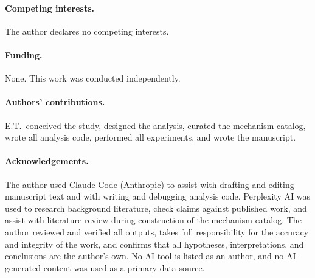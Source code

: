 \documentclass[11pt]{article}
\begin{document}
\paragraph{Competing interests.}
The author declares no competing interests.

\paragraph{Funding.}
None. This work was conducted independently.

\paragraph{Authors' contributions.}
E.T.\ conceived the study, designed the analysis, curated the mechanism catalog, wrote all analysis code, performed all experiments, and wrote the manuscript.

\paragraph{Acknowledgements.}
The author used Claude Code (Anthropic) to assist with drafting and editing manuscript text and with writing and debugging analysis code. Perplexity AI was used to research background literature, check claims against published work, and assist with literature review during construction of the mechanism catalog. The author reviewed and verified all outputs, takes full responsibility for the accuracy and integrity of the work, and confirms that all hypotheses, interpretations, and conclusions are the author's own. No AI tool is listed as an author, and no AI-generated content was used as a primary data source.



\end{document}
